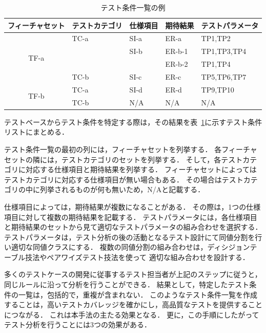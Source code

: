 \begin{table}[htbp]
  \centering
  \caption{テスト条件一覧の例}
    \begin{tabular}{|c|p{6em}|p{6em}|p{6em}|p{7.145em}|}
    \hline
    \multicolumn{1}{|p{8.855em}|}{\textbf{フィーチャセット}} & \textbf{テストカテゴリ} & \textbf{仕様項目} & \textbf{期待結果} & \textbf{テストパラメータ} \bigstrut \\
    \hline
    \multicolumn{1}{|c|}{\multirow{4}[8]{*}{TF-a}} & TC-a  & SI-a  & ER-a  & TP1,TP2 \bigstrut\\
\cline{2-5}          & \multicolumn{1}{l|}{} & SI-b  & ER-b-1 & TP1,TP3,TP4 \bigstrut\\
\cline{2-5}          & \multicolumn{1}{l|}{} & \multicolumn{1}{l|}{} & ER-b-2 & TP1,TP4 \bigstrut\\
\cline{2-5}          & TC-b  & SI-c  & ER-c  & TP5,TP6,TP7 \bigstrut\\
    \hline
    \multicolumn{1}{|c|}{\multirow{2}[4]{*}{TF-b}} & TC-a  & SI-d  & ER-d  & TP9,TP10 \bigstrut\\
\cline{2-5}          & TC-b  & N/A   & N/A   & N/A \bigstrut\\
    \hline
    \end{tabular}%
  \label{tbl:D-3-tbl3}%
\end{table}%

テストベースからテスト条件を特定する際は，その結果を表~\ref{tbl:D-3-tbl3}に示すテスト条件リストにまとめる．

テスト条件一覧の最初の列には，フィーチャセットを列挙する．
各フィーチャセットの隣には，テストカテゴリのセットを列挙する．
そして，各テストカテゴリに対応する仕様項目と期待結果を列挙する．
フィーチャセットによってはテストカテゴリに対応する仕様項目が無い場合もある．
その場合はテストカテゴリの中に列挙されるものが何も無いため，N/Aと記載する．


仕様項目によっては，期待結果が複数になることがある．
その際は，1つの仕様項目に対して複数の期待結果を記載する．
テストパラメータには，各仕様項目と期待結果のセットから見て適切なテストパラメータの組み合わせを選択する．
テストパラメータは，テスト分析の後の活動となるテスト設計にて同値分割を行い適切な同値クラスにする．
複数の同値分割の組み合わせは，ディシジョンテーブル技法やペアワイズテスト技法を使って
適切な組み合わせを設計する．

多くのテストケースの開発に従事するテスト担当者が上記のステップに従うと，同じルールに沿って分析を行うことができる．
結果として，特定したテスト条件の一覧は，包括的で，重複が含まれない．
このようなテスト条件一覧を作成することは，高いテストカバレッジを確かにし，高品質なテストを提供することにつながる．
これは本手法の主たる効果となる．
更に，この手順にしたがってテスト分析を行うことには3つの効果がある．


